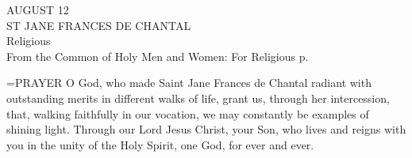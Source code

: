 \begin{center}\normalsize AUGUST 12\\
\footnotesize ST JANE FRANCES DE CHANTAL\\
\footnotesize Religious\\
\footnotesize From the Common of Holy Men and Women: For Religious p.\\
\end{center}

\hangindent=\parindent \small{PRAYER 
O God, who made Saint Jane Frances de Chantal
radiant with outstanding merits in different walks of life,
grant us, through her intercession,
that, walking faithfully in our vocation,
we may constantly be examples of shining light.
Through our Lord Jesus Christ, your Son,
who lives and reigns with you in the unity of the Holy Spirit,
one God, for ever and ever.\\}
 
